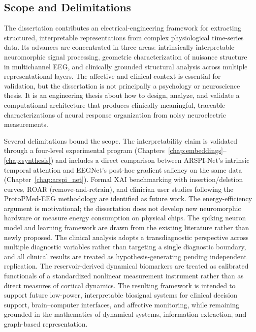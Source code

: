 \subsection{Scope and Delimitations}

The dissertation contributes an electrical-engineering framework for extracting structured, interpretable representations from complex physiological time-series data. Its advances are concentrated in three areas: intrinsically interpretable neuromorphic signal processing, geometric characterization of nuisance structure in multichannel EEG, and clinically grounded structural analysis across multiple representational layers. The affective and clinical context is essential for validation, but the dissertation is not principally a psychology or neuroscience thesis. It is an engineering thesis about how to design, analyze, and validate a computational architecture that produces clinically meaningful, traceable characterizations of neural response organization from noisy neuroelectric measurements.

Several delimitations bound the scope. The interpretability claim is validated through a four-level experimental program (Chapters~\ref{chap:embeddings}--\ref{chap:synthesis}) and includes a direct comparison between ARSPI-Net's intrinsic temporal attention and EEGNet's post-hoc gradient saliency on the same data (Chapter~\ref{chap:arspi_net}). Formal XAI benchmarking with insertion/deletion curves, ROAR (remove-and-retrain), and clinician user studies following the ProtoPMed-EEG methodology \cite{barnett_protopmed_2024} are identified as future work. The energy-efficiency argument is motivational; the dissertation does not develop new neuromorphic hardware or measure energy consumption on physical chips. The spiking neuron model and learning framework are drawn from the existing literature rather than newly proposed. The clinical analysis adopts a transdiagnostic perspective across multiple diagnostic variables rather than targeting a single diagnostic boundary, and all clinical results are treated as hypothesis-generating pending independent replication. The reservoir-derived dynamical biomarkers are treated as calibrated functionals of a standardized nonlinear measurement instrument rather than as direct measures of cortical dynamics. The resulting framework is intended to support future low-power, interpretable biosignal systems for clinical decision support, brain--computer interfaces, and affective monitoring, while remaining grounded in the mathematics of dynamical systems, information extraction, and graph-based representation.